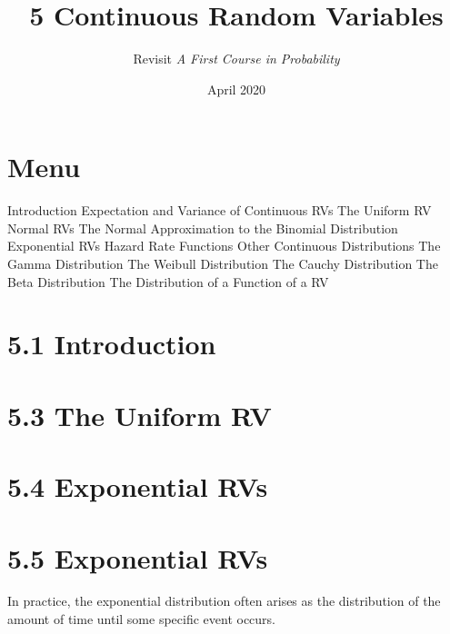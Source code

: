\documentclass{article}
\title{5 Continuous Random Variables}
\author{Revisit \emph{A First Course in Probability}}
\date{April 2020}
\begin{document}
\maketitle

\section*{Menu}
\begin{outline}[enumerate]
    \1  Introduction
    \1  Expectation and Variance of Continuous RVs 
    \1  The Uniform RV
    \1  Normal RVs
        \2 The Normal Approximation to the Binomial Distribution
    \1  Exponential RVs
        \2 Hazard Rate Functions
    \1  Other Continuous Distributions
        \2 The Gamma Distribution
        \2 The Weibull Distribution
        \2 The Cauchy Distribution
        \2 The Beta Distribution
    \1  The Distribution of a Function of a RV
\end{outline}


\section*{5.1 Introduction}
\section*{5.3 The Uniform RV}
\section*{5.4 Exponential RVs}
\section*{5.5 Exponential RVs}
In practice, the exponential distribution often arises as the distribution of the amount of time until some specific event occurs.





\end{document}
